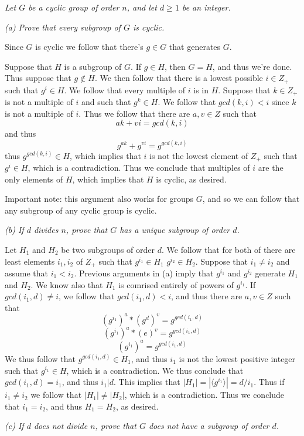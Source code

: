 \documentclass[11pt,oneside,titlepage]{book}
\newcommand{\eangle}[1]{\langle #1 \rangle}
\begin{document}
\textit{Let $G$ be a cyclic group of order $n$, and let $d \geq 1$ be
  an integer.}

\textit{(a) Prove that every subgroup of $G$ is cyclic.}

Since $G$ is cyclic we follow that there's $g \in G$ that generates
$G$.

Suppose that $H$ is a subgroup of $G$. If $g \in H$, then $G = H$, and
thus we're done. Thus suppose that $g \notin H$. We then follow that
there is a lowest possible $i \in Z_+$ such that $g^i \in H$. We
follow that every multiple of $i$ is in $H$. Suppose that $k \in Z_+$
is not a multiple of $i$ and such that $g^k \in H$. We follow that
$gcd(k, i) < i$ since $k$ is not a multiple of $i$. Thus we follow
that there are $a, v \in Z$ such that
$$ak + vi = gcd(k, i)$$
and thus
$$g^{ak} + g^{vi} = g^{gcd(k, i)}$$
thus $g^{gcd(k, i)} \in H$, which implies that $i$ is not the lowest element
of $Z_+$ such that $g^i \in H$, which is a contradiction. Thus we
conclude that multiples of $i$ are the only elements of $H$, which implies that
$H$ is cyclic, as desired.

Important note: this argument also works for groups $G$, and so we can follow that
any subgroup of any cyclic group is cyclic.

\textit{(b) If $d$ divides $n$, prove that $G$ has a unique subgroup of order $d$.}

Let $H_1$ and $H_2$ be two subgroups of order $d$. We follow that for
both of there are least elements $i_1, i_2$ of $Z_+$ such that
$g^{i_1} \in H_1$ $g^{i_2} \in H_2$. Suppose that $i_1 \neq i_2$ and
assume that $i_1 < i_2$.  Previous arguments in (a) imply that $g^{i_1}$ and
$g^{i_2}$ generate $H_1$ and $H_2$. We know also that $H_1$ is comrised entirely of
powers of $g^{i_1}$. If $gcd(i_1, d) \neq i$, we follow that $gcd(i_1, d) < i$,
and thus there are $a, v \in Z$ such that
$$(g^{i_1})^a * (g^{d})^v = g^{gcd(i_1, d)}$$
$$(g^{i_1})^a * (e)^v = g^{gcd(i_1, d)}$$
$$(g^{i_1})^a  = g^{gcd(i_1, d)}$$
We thus follow that $g^{gcd(i_1, d)} \in H_1$, and thus $i_1$ is not
the lowest positive integer such that $g^{i_1} \in H$, which is a
contradiction. We thus conclude that $gcd(i_1, d) = i_1$, and thus
$i_1 | d$. This implies that $|H_1| = |\eangle{g^{i_1}}| = d / i_1$.
Thus if $i_1 \neq i_2$ we follow that $|H_1| \neq |H_2|$, which is a
contradiction. Thus we conclude that $i_1 = i_2$, and thus $H_1 = H_2$,
as desired.

\textit{(c) If $d$ does not divide $n$, prove that $G$ does not have a subgroup of order $d$.}
\end{document}
